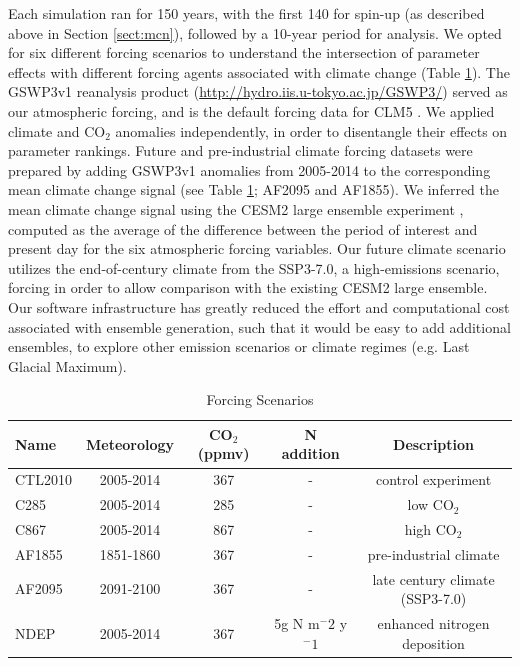 \documentclass[draft]{agujournal2019}
\begin{document}
Each simulation ran for 150 years, with the first 140 for spin-up (as described above in Section \ref{sect:mcn}), followed by a 10-year period for analysis. We opted for six different forcing scenarios to understand the intersection of parameter effects with different forcing agents associated with climate change (Table \ref{tab:exps}). The GSWP3v1 reanalysis product (\url{http://hydro.iis.u-tokyo.ac.jp/GSWP3/}) served as our atmospheric forcing, and is the default forcing data for CLM5 \cite{lawrence2019}. We applied climate and CO$_2$ anomalies independently, in order to disentangle their effects on parameter rankings. Future and pre-industrial climate forcing datasets were prepared by adding GSWP3v1 anomalies from 2005-2014 to the corresponding mean climate change signal (see Table \ref{tab:exps}; AF2095 and AF1855). We inferred the mean climate change signal using the CESM2 large ensemble experiment \cite{rodgers2021}, computed as the average of the difference between the period of interest and present day for the six atmospheric forcing variables. Our future climate scenario utilizes the end-of-century climate from the SSP3-7.0, a high-emissions scenario, forcing in order to allow comparison with the existing CESM2 large ensemble. Our software infrastructure has greatly reduced the effort and computational cost associated with ensemble generation, such that it would be easy to add additional ensembles, to explore other emission scenarios or climate regimes (e.g. Last Glacial Maximum).  

\label{sect:exps}
 \begin{table}[h]
 \caption{Forcing Scenarios}
 \centering
 \begin{tabular}{l c c c c}
 \hline
  Name  & Meteorology & CO$_2$ (ppmv) & N addition & Description \\
 \hline
   CTL2010  & 2005-2014 & 367 & - & control experiment\\
   C285        & 2005-2014 & 285 & - & low CO$_2$ \\
   C867        & 2005-2014 & 867 & - & high CO$_2$ \\
   AF1855    & 1851-1860 & 367 & - & pre-industrial climate \\
   AF2095    & 2091-2100 & 367 & - & late century climate (SSP3-7.0) \\
   NDEP      & 2005-2014 & 367 & 5g N m$^-2$  y$^-1$ & enhanced nitrogen deposition \\
 \hline
 \end{tabular}
 \label{tab:exps}
 \end{table}
\end{document}
